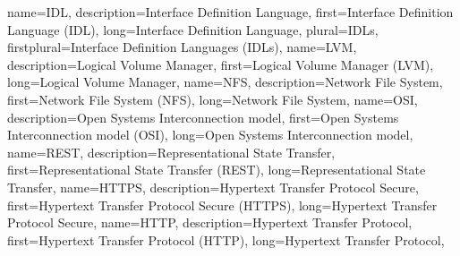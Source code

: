{%
    name={IDL},
    description={Interface Definition Language},
    first={Interface Definition Language (IDL)},
    long={Interface Definition Language},
    plural={IDLs},
    firstplural={Interface Definition Languages (IDLs)},
}
{%
    name={LVM},
    description={Logical Volume Manager},
    first={Logical Volume Manager (LVM)},
    long={Logical Volume Manager},
}
{%
    name={NFS},
    description={Network File System},
    first={Network File System (NFS)},
    long={Network File System},
}
{%
    name={OSI},
    description={Open Systems Interconnection model},
    first={Open Systems Interconnection model (OSI)},
    long={Open Systems Interconnection model},
}
{%
    name={REST},
    description={Representational State Transfer},
    first={Representational State Transfer (REST)},
    long={Representational State Transfer},
}
{%
    name={HTTPS},
    description={Hypertext Transfer Protocol Secure},
    first={Hypertext Transfer Protocol Secure (HTTPS)},
    long={Hypertext Transfer Protocol Secure},
}
{%
    name={HTTP},
    description={Hypertext Transfer Protocol},
    first={Hypertext Transfer Protocol (HTTP)},
    long={Hypertext Transfer Protocol},
}



